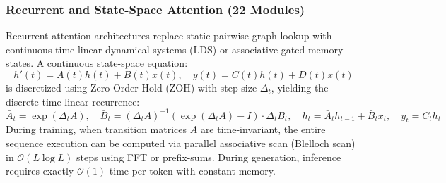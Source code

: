 \documentclass{article}
\begin{document}
\subsubsection{Recurrent and State-Space Attention (22 Modules)}
Recurrent attention architectures replace static pairwise graph lookup with continuous-time linear dynamical systems (LDS) or associative gated memory states. A continuous state-space equation:
\begin{equation}
    h'(t) = A(t) h(t) + B(t) x(t), \quad y(t) = C(t) h(t) + D(t) x(t)
\end{equation}
is discretized using Zero-Order Hold (ZOH) with step size $\Delta_t$, yielding the discrete-time linear recurrence:
\begin{equation}
    \bar{A}_t = \exp(\Delta_t A), \quad \bar{B}_t = (\Delta_t A)^{-1}(\exp(\Delta_t A) - I) \cdot \Delta_t B_t, \quad h_t = \bar{A}_t h_{t-1} + \bar{B}_t x_t, \quad y_t = C_t h_t
\end{equation}
During training, when transition matrices $\bar{A}$ are time-invariant, the entire sequence execution can be computed via parallel associative scan (Blelloch scan) in $\mathcal{O}(L \log L)$ steps using FFT or prefix-sums. During generation, inference requires exactly $\mathcal{O}(1)$ time per token with constant memory.
\end{document}

